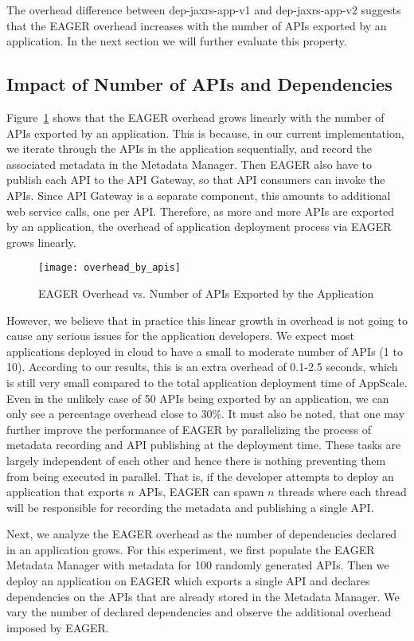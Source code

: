 The overhead difference between dep-jaxrs-app-v1 and dep-jaxrs-app-v2 suggests that the EAGER overhead increases with the number
of APIs exported by an application. In the next section we will further evaluate this property.

\subsection{Impact of Number of APIs and Dependencies}

Figure~\ref{fig:overhead_by_apis} shows that the EAGER overhead grows linearly with the number of APIs exported by an application.
This is because, in our current implementation, we iterate through the APIs in the application sequentially, and record the associated metadata in the
Metadata Manager. Then EAGER also have to publish each API to the API Gateway, so that API consumers can invoke the APIs. Since
API Gateway is a separate component, this amounts to additional web service calls, one per API. Therefore, as more and more APIs are exported 
by an application, the overhead of application deployment process via EAGER grows linearly. 

\begin{figure}
\centering
\texttt{[image: overhead\_by\_apis]}
\caption{EAGER Overhead vs. Number of APIs Exported by the Application}
\label{fig:overhead_by_apis}
\end{figure}

However, we believe that in practice this linear growth in overhead is not going to cause any serious issues for the application developers.
We expect most applications deployed in cloud to have a small to moderate number of APIs (1 to 10). According to our results, this is an 
extra overhead of 0.1-2.5 seconds, which is still very small compared to the total application deployment time of AppScale. Even in the
unlikely case of 50 APIs being exported by an application, we can only see a percentage overhead close to 30\%. It must also be noted, that
one may further improve the performance of EAGER by parallelizing the process of metadata recording and API publishing at the deployment
time. These tasks are largely independent of each other and hence there is nothing preventing them from being executed in parallel. That is,
if the developer attempts to deploy an application that exports $n$ APIs, EAGER can spawn $n$ threads where each thread will be responsible
for recording the metadata and publishing a single API.

Next, we analyze the EAGER overhead as the number of dependencies declared in an application grows. For this experiment, we first populate 
the EAGER Metadata Manager with metadata for 100 randomly generated APIs. Then we deploy an application on EAGER which exports a single
API and declares dependencies on the APIs that are already stored in the Metadata Manager. We vary the number of declared dependencies and
observe the additional overhead imposed by EAGER.

